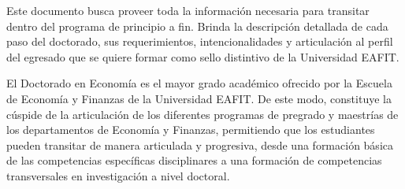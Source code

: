
Este documento busca proveer toda la información necesaria para transitar dentro del programa de principio a fin. Brinda la descripción detallada de cada paso del doctorado, sus requerimientos, intencionalidades y articulación al perfil del egresado que se quiere formar como sello distintivo de la Universidad EAFIT.

El Doctorado en Economía es el mayor grado académico ofrecido por la Escuela de Economía y Finanzas de la Universidad EAFIT. De este modo, constituye la cúspide de la articulación de los diferentes programas de pregrado y maestrías de los departamentos de Economía y Finanzas, permitiendo que los estudiantes pueden transitar de manera articulada y progresiva, desde una formación básica de las competencias específicas disciplinares a una formación de competencias transversales en investigación a nivel doctoral. 



